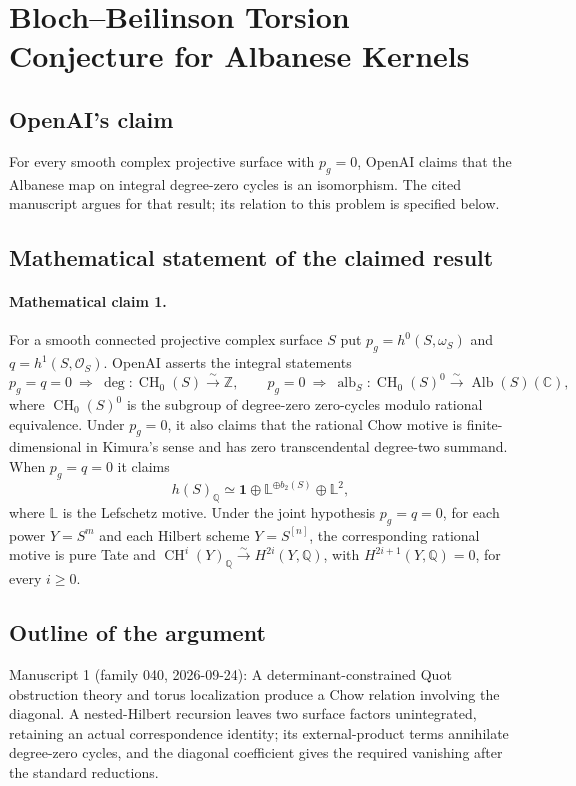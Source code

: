 \documentclass[11pt]{article}
\begin{document}
\section*{Bloch–Beilinson Torsion Conjecture for Albanese Kernels}

\subsection{OpenAI's claim}
For every smooth complex projective surface with $p_g=0$, OpenAI claims that the Albanese map on integral degree-zero cycles is an isomorphism. The cited manuscript argues for that result; its relation to this problem is specified below.

\subsection{Mathematical statement of the claimed result}
\paragraph{Mathematical claim 1.} For a smooth connected projective complex surface $S$ put $p_g=h^0(S,\omega_S)$ and $q=h^1(S,\mathcal O_S)$. OpenAI asserts the integral statements
\[
p_g=q=0\ \Longrightarrow\ \deg:\operatorname{CH}_0(S)\xrightarrow{\sim}\mathbb Z,
\qquad
p_g=0\ \Longrightarrow\ \operatorname{alb}_S:\operatorname{CH}_0(S)^0\xrightarrow{\sim}\operatorname{Alb}(S)(\mathbb C),
\]
where $\operatorname{CH}_0(S)^0$ is the subgroup of degree-zero zero-cycles modulo rational equivalence. Under $p_g=0$, it also claims that the rational Chow motive is finite-dimensional in Kimura's sense and has zero transcendental degree-two summand. When $p_g=q=0$ it claims
\[
h(S)_{\mathbb Q}\simeq\mathbf1\oplus\mathbb L^{\oplus b_2(S)}\oplus\mathbb L^2,
\]
where $\mathbb L$ is the Lefschetz motive. Under the joint hypothesis $p_g=q=0$, for each power $Y=S^m$ and each Hilbert scheme $Y=S^{[n]}$, the corresponding rational motive is pure Tate and $\operatorname{CH}^i(Y)_{\mathbb Q}\xrightarrow{\sim}H^{2i}(Y,\mathbb Q)$, with $H^{2i+1}(Y,\mathbb Q)=0$, for every $i\ge0$.

\subsection{Outline of the argument}
Manuscript 1 (family 040, 2026-09-24): A determinant-constrained Quot obstruction theory and torus localization produce a Chow relation involving the diagonal. A nested-Hilbert recursion leaves two surface factors unintegrated, retaining an actual correspondence identity; its external-product terms annihilate degree-zero cycles, and the diagonal coefficient gives the required vanishing after the standard reductions.
\end{document}
